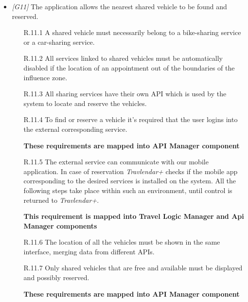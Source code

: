 \begin{itemize}
\begin{itemize}
		\end{itemize}





	\item \textit{[G11]} The application allows the nearest shared vehicle to be found and reserved.

		\begin{itemize}

			\item [R.11.1] A shared vehicle must necessarily belong to a bike-sharing service or a car-sharing service.

			\item [R.11.2] All services linked to shared vehicles must be automatically disabled if the location of an appointment out of the boundaries of the influence zone.

			\item [R.11.3] All sharing services have their own API which is used by the system to locate and reserve the vehicles.

			\item [R.11.4] To find or reserve a vehicle it's required that the user logins into the external corresponding service.
			
			\textbf{These requirements are mapped into API Manager component}

			\item [R.11.5] The external service can communicate with our mobile application. In case of reservation \textit{Travlendar+} checks if the mobile app corresponding to the desired services is installed on the system. All the following steps take place within such an environment, until control is returned to \textit{Travlendar+}.
			
			\textbf{This requirement is mapped into Travel Logic Manager and Api Manager components}

			\item [R.11.6] The location of all the vehicles must be shown in the same interface, merging data from different APIs.

			\item[R.11.7] Only shared vehicles that are free and available must be displayed and possibly reserved.
			
			\textbf{These requirements are mapped into API Manager component}

		\end{itemize}






\end{itemize}
